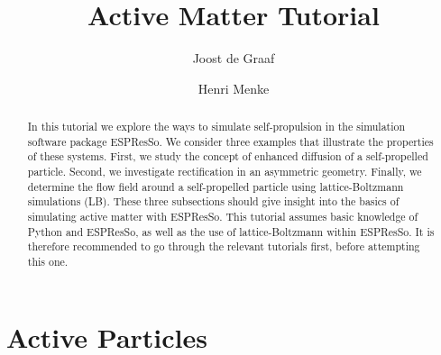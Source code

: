 \documentclass[aip,jcp,reprint,a4paper,onecolumn,amsmath]{revtex4-1}
\newcommand{\es}{\mbox{\textsf{ESPResSo}}\xspace}
\begin{document}
\title{Active Matter Tutorial}
\author{Joost de Graaf}
\author{Henri Menke}

\begin{abstract}
In this tutorial we explore the ways to simulate self-propulsion in the
simulation software package \es{}. We consider three examples that illustrate
the properties of these systems. First, we study the concept of enhanced
diffusion of a self-propelled particle. Second, we investigate rectification in
an asymmetric geometry. Finally, we determine the flow field around a
self-propelled particle using lattice-Boltzmann simulations (LB). These three
subsections should give insight into the basics of simulating active matter
with \es{}. This tutorial assumes basic knowledge of Python and \es{}, as well
as the use of lattice-Boltzmann within \es{}. It is therefore recommended to go
through the relevant tutorials first, before attempting this one.
\end{abstract}

\maketitle

\section{\label{sec:active}Active Particles}
\end{document}
